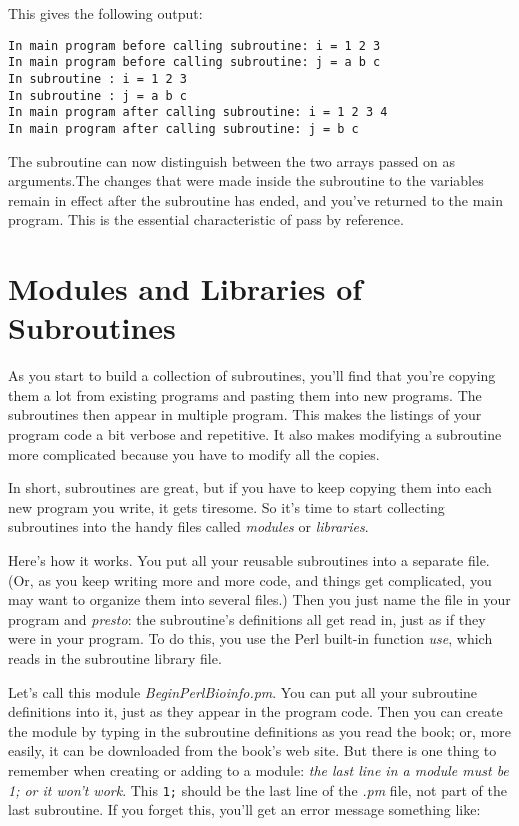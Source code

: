 This gives the following output:

\begin{lstlisting}
In main program before calling subroutine: i = 1 2 3
In main program before calling subroutine: j = a b c
In subroutine : i = 1 2 3
In subroutine : j = a b c
In main program after calling subroutine: i = 1 2 3 4
In main program after calling subroutine: j = b c
\end{lstlisting}

The subroutine can now distinguish between the two arrays passed on as arguments.The changes that were made inside the subroutine to the variables remain in effect after the subroutine has ended, and you've returned to the main program. This is the essential characteristic of pass by reference. 

\section{Modules and Libraries of Subroutines}
As you start to build a collection of subroutines, you'll find that you're copying them a lot from existing programs and pasting them into new programs. The subroutines then appear in multiple program. This makes the listings of your program code a bit verbose and repetitive. It also makes modifying a subroutine more complicated because you have to modify all the copies.

In short, subroutines are great, but if you have to keep copying them into each new program you write, it gets tiresome. So it's time to start collecting subroutines into the handy files called \textit{modules} or \textit{libraries}.

Here's how it works. You put all your reusable subroutines into a separate file. (Or, as you keep writing more and more code, and things get complicated, you may want to organize them into several files.) Then you just name the file in your program and \textit{presto}: the subroutine's definitions all get read in, just as if they were in your program. To do this, you use the Perl built-in function \textit{use}, which reads in the subroutine library file.

Let's call this module \textit{BeginPerlBioinfo.pm}. You can put all your subroutine definitions into it, just as they appear in the program code.  Then you can create the module by typing in the subroutine definitions as you read the book; or, more easily, it can be downloaded from the book's web site. But there is one thing to remember when creating or adding to a module: \textit{the last line in a module must be 1; or it won't work}. This \verb|1;| should be the last line of the \textit{.pm} file, not part of the last subroutine. If you forget this, you'll get an error message something like: 

